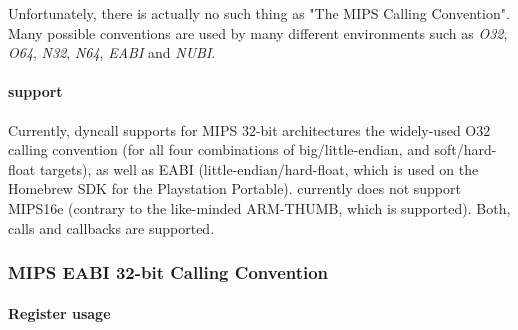 Unfortunately, there is actually no such thing as "The MIPS Calling Convention". Many possible conventions are used
by many different environments such as \emph{O32}\cite{MIPSo32}, \emph{O64}\cite{MIPSo64}, \emph{N32}\cite{MIPSn32/n64}, \emph{N64}\cite{MIPSn32/n64}, \emph{EABI}\cite{MIPSeabi} and \emph{NUBI}\cite{MIPSnubi}.\\

\paragraph{ support}

Currently, dyncall supports for MIPS 32-bit architectures the widely-used O32 calling convention (for all four combinations of big/little-endian, and soft/hard-float targets),
as well as EABI (little-endian/hard-float, which is used on the Homebrew SDK for the Playstation Portable).  currently does not support MIPS16e
(contrary to the like-minded ARM-THUMB, which is supported). Both, calls and callbacks are supported.


\clearpage


\subsubsection{MIPS EABI 32-bit Calling Convention}


\paragraph{Register usage}

